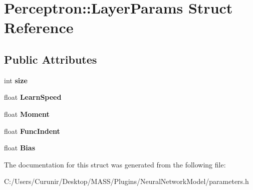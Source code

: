 \hypertarget{struct_perceptron_1_1_layer_params}{}\section{Perceptron\+:\+:Layer\+Params Struct Reference}
\label{struct_perceptron_1_1_layer_params}
\subsection*{Public Attributes}
\begin{DoxyCompactItemize}
\item 
\mbox{\label{struct_perceptron_1_1_layer_params_a2b7908df7e8e4f1b8d836d732fc29fde}} 
int {\bfseries size}
\item 
\mbox{\label{struct_perceptron_1_1_layer_params_aecb000611727cbf8ad2051118f2d8234}} 
float {\bfseries Learn\+Speed}
\item 
\mbox{\label{struct_perceptron_1_1_layer_params_a78bd006d129e016f1f710b9c07b2f985}} 
float {\bfseries Moment}
\item 
\mbox{\label{struct_perceptron_1_1_layer_params_a9c9b4e0e12a9705d99a3392873088d7d}} 
float {\bfseries Func\+Indent}
\item 
\mbox{\label{struct_perceptron_1_1_layer_params_a3ac7b22335513c6b707d99ac45ec95db}} 
float {\bfseries Bias}
\end{DoxyCompactItemize}


The documentation for this struct was generated from the following file\+:\begin{DoxyCompactItemize}
\item 
C\+:/\+Users/\+Curunir/\+Desktop/\+M\+A\+S\+S/\+Plugins/\+Neural\+Network\+Model/parameters.\+h\end{DoxyCompactItemize}

